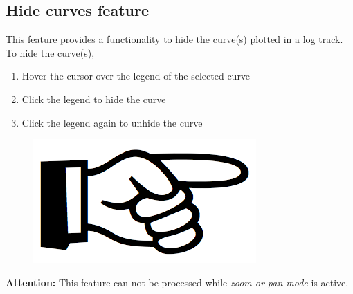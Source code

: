 \documentclass[12pt,a4paper,oneside]{report}
\begin{document}
\subsection{Hide curves feature}
This feature provides a functionality to hide the curve(s) plotted in a log track. To hide the curve(s),
\begin{enumerate}
\setlength\itemsep{0.1em}
\item Hover the cursor over the legend of the selected curve
\item Click the legend to hide the curve
\item Click the legend again to unhide the curve
\end{enumerate}

\begin{figure}
\vspace{-15pt}
\includegraphics[scale=0.08]{fig/hand_point.png}
\end{figure}
\noindent\textbf{Attention:} This feature can not be processed while \emph{zoom or pan mode} is active.
\end{document}
